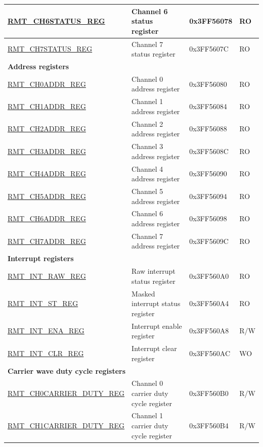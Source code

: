 \begin{longtable}{ |p{5cm}|p{6.6cm}|p{2.2cm}|p{1.2cm}| }
\hyperref[regdesc:RMTCHnSTATUSREG]{RMT\_CH6STATUS\_REG} & Channel 6 status register & 0x3FF56078 & RO \\ \hline
\hyperref[regdesc:RMTCHnSTATUSREG]{RMT\_CH7STATUS\_REG} & Channel 7 status register & 0x3FF5607C & RO \\ \hline
\multicolumn{4}{|l|}{\textbf{Address registers}} \\ \hline
\hyperref[regdesc:RMTCHnADDRREG]{RMT\_CH0ADDR\_REG} & Channel 0 address register & 0x3FF56080 & RO \\ \hline
\hyperref[regdesc:RMTCHnADDRREG]{RMT\_CH1ADDR\_REG} & Channel 1 address register & 0x3FF56084 & RO \\ \hline
\hyperref[regdesc:RMTCHnADDRREG]{RMT\_CH2ADDR\_REG} & Channel 2 address register & 0x3FF56088 & RO \\ \hline
\hyperref[regdesc:RMTCHnADDRREG]{RMT\_CH3ADDR\_REG} & Channel 3 address register & 0x3FF5608C & RO \\ \hline
\hyperref[regdesc:RMTCHnADDRREG]{RMT\_CH4ADDR\_REG} & Channel 4 address register & 0x3FF56090 & RO \\ \hline
\hyperref[regdesc:RMTCHnADDRREG]{RMT\_CH5ADDR\_REG} & Channel 5 address register & 0x3FF56094 & RO \\ \hline
\hyperref[regdesc:RMTCHnADDRREG]{RMT\_CH6ADDR\_REG} & Channel 6 address register & 0x3FF56098 & RO \\ \hline
\hyperref[regdesc:RMTCHnADDRREG]{RMT\_CH7ADDR\_REG} & Channel 7 address register & 0x3FF5609C & RO \\ \hline
\multicolumn{4}{|l|}{\textbf{Interrupt registers}} \\ \hline
\hyperref[regdesc:RMTINTRAWREG]{RMT\_INT\_RAW\_REG} & Raw interrupt status register & 0x3FF560A0 & RO \\ \hline
\hyperref[regdesc:RMTINTSTREG]{RMT\_INT\_ST\_REG} & Masked interrupt status register & 0x3FF560A4 & RO \\ \hline
\hyperref[regdesc:RMTINTENAREG]{RMT\_INT\_ENA\_REG} & Interrupt enable register & 0x3FF560A8 & R/W \\ \hline
\hyperref[regdesc:RMTINTCLRREG]{RMT\_INT\_CLR\_REG} & Interrupt clear register & 0x3FF560AC & WO \\ \hline
\multicolumn{4}{|l|}{\textbf{Carrier wave duty cycle registers}} \\ \hline
\hyperref[regdesc:RMTCHnCARRIERDUTYREG]{RMT\_CH0CARRIER\_DUTY\_REG} & Channel 0 carrier duty cycle register & 0x3FF560B0 & R/W \\ \hline
\hyperref[regdesc:RMTCHnCARRIERDUTYREG]{RMT\_CH1CARRIER\_DUTY\_REG} & Channel 1 carrier duty cycle register & 0x3FF560B4 & R/W \\ \hline

\end{longtable}
